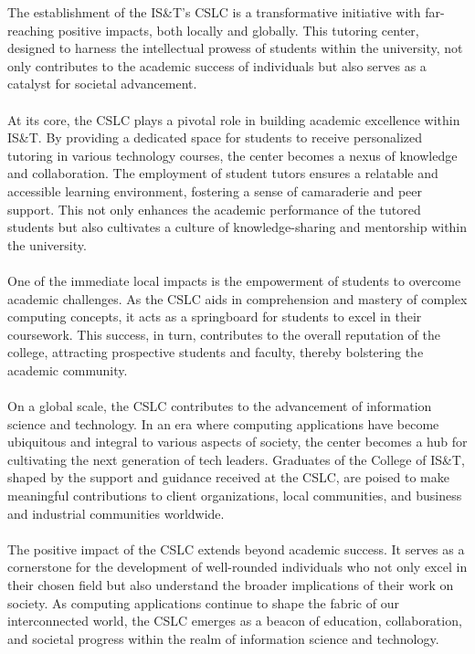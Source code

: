 \documentclass[oneside,openany,obeyspaces]{book}
\newcommand\tab[1][1cm]{\hspace*{#1}}
\begin{document}
\begin{flushleft}
    \tab The establishment of the IS\&T's CSLC is a transformative initiative with far-reaching positive impacts, both locally and globally. This tutoring center, designed to harness the intellectual prowess of students within the university, not only contributes to the academic success of individuals but also serves as a catalyst for societal advancement.\\~\\

    \tab At its core, the CSLC plays a pivotal role in building academic excellence within IS\&T. By providing a dedicated space for students to receive personalized tutoring in various technology courses, the center becomes a nexus of knowledge and collaboration. The employment of student tutors ensures a relatable and accessible learning environment, fostering a sense of camaraderie and peer support. This not only enhances the academic performance of the tutored students but also cultivates a culture of knowledge-sharing and mentorship within the university.\\~\\

    \tab One of the immediate local impacts is the empowerment of students to overcome academic challenges. As the CSLC aids in comprehension and mastery of complex computing concepts, it acts as a springboard for students to excel in their coursework. This success, in turn, contributes to the overall reputation of the college, attracting prospective students and faculty, thereby bolstering the academic community.\\~\\

    \tab On a global scale, the CSLC contributes to the advancement of information science and technology. In an era where computing applications have become ubiquitous and integral to various aspects of society, the center becomes a hub for cultivating the next generation of tech leaders. Graduates of the College of IS\&T, shaped by the support and guidance received at the CSLC, are poised to make meaningful contributions to client organizations, local communities, and business and industrial communities worldwide.\\~\\

    \tab The positive impact of the CSLC extends beyond academic success. It serves as a cornerstone for the development of well-rounded individuals who not only excel in their chosen field but also understand the broader implications of their work on society. As computing applications continue to shape the fabric of our interconnected world, the CSLC emerges as a beacon of education, collaboration, and societal progress within the realm of information science and technology.\\~\\






\end{flushleft}
\end{document}
